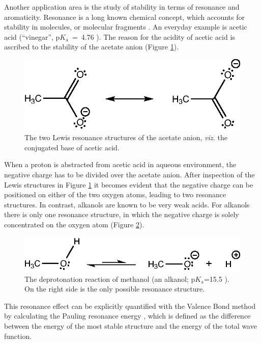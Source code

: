 Another application area is the study of stability in terms of resonance and aromaticity. Resonance is a long known chemical concept, which accounts for stability in molecules, or molecular fragments \cite{whelandbook}. An everyday example is acetic acid (``vinegar'', p$K_\mathrm{a}$~=~4.76 \cite{bruice}). The reason for the acidity of acetic acid is ascribed to the stability of the acetate anion (Figure \ref{ch1.fig.acetic}).
\begin{figure}[htdp]
\center
\includegraphics{introduction/figures/acetic.eps}
\caption{The two Lewis resonance structures of the acetate anion, \textit{viz.} the conjugated base of acetic acid.}
\label{ch1.fig.acetic}
\end{figure}
When a proton is abstracted from acetic acid in aqueous environment, the negative charge has to be divided over the acetate anion. After inspection of the Lewis structures in Figure \ref{ch1.fig.acetic} it becomes evident that the negative charge can be positioned on either of the two oxygen atoms, leading to two resonance structures. In contrast, alkanols are known to be very weak acids. For alkanols there is only one resonance structure, in which the negative charge is solely concentrated on the oxygen atom (Figure \ref{ch1.fig.alcohol}).
\begin{figure}[htdp]
\center
\includegraphics{introduction/figures/alcohol.eps}
\caption{The deprotonation reaction of methanol (an alkanol; p$K_\mathrm{a}$=15.5 \cite{bruice}). On the right side is the only possible resonance structure.}
\label{ch1.fig.alcohol}
\end{figure}
This resonance effect can be explicitly quantified with the Valence Bond method by calculating the Pauling resonance energy \cite{paulingbook}, which is defined as the difference between the energy of the most stable structure and the energy of the total wave function. 

